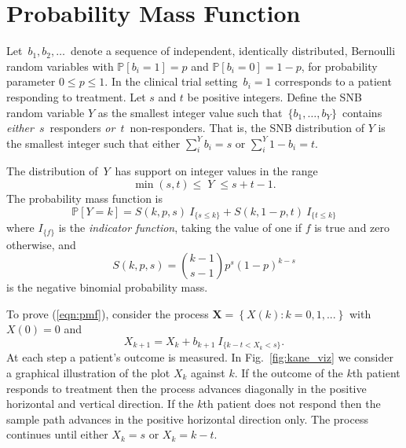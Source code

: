 \documentclass[review]{elsarticle}
\begin{document}
\section{Probability Mass Function}
\label{notation.section}

Let $\,b_1, b_2, \ldots \,$ denote a sequence of independent, identically
distributed, Bernoulli random variables with $\mathbb{P}[b_i=1]=p$ and
$\mathbb{P}[b_i = 0] = 1-p$, for
probability parameter $0\leq p \leq 1$. In the clinical trial setting
$\,b_i = 1$ corresponds to a patient responding to treatment.  
Let $s$ and $t$ be positive integers.  Define the SNB random
variable $Y$ as the smallest
integer value such that $\,\{b_1, \ldots , b_Y\}\,$ contains {\em either}
$\,s\,$ responders {\em or} $\,t\,$ non-responders. That is, the SNB 
distribution of $Y$ is the smallest integer such that either
$\sum_i^Y b_i = s$ or $\sum_i^Y 1-b_i = t$.

The distribution of $\,Y\,$ has support on integer values in the range
\begin{equation*}               
     \min(s,t) \leq \; Y \;\leq s+t-1  \label{range.y.eq}.
\end{equation*}
The probability mass function is
\begin{equation} \label{eqn:pmf}
\mathbb{P} [Y=k] = S(k, p, s) \ I_{\{s \leq k\}} + 
  S(k, 1-p, t) \ I_{\{ t \leq k \}}
\end{equation}
where $I_{\{f\}}$ is the {\em indicator function}, taking the value 
of one if $f$ is true and zero otherwise, and
\begin{equation} \label{eqn:N}
S(k, p, s) = {k-1 \choose s-1} p^s (1-p)^{k-s} 
\end{equation}
is the negative binomial probability mass.

To prove (\ref{eqn:pmf}), consider the
process $\mathbf{X} = \left\{X(k) : k = 0,1,... \right\}$
with $X(0)=0$ and
\begin{equation*} \label{eqn:proc}
X_{k+1} = X_k + b_{k+1} \ I_{\{ k-t < X_k < s\}}.
\end{equation*}
At each step a patient's outcome is measured. In Fig.~\ref{fig:kane_viz} 
we consider a graphical illustration of the plot $X_k$ against
$k$. If the outcome of the $k$th patient responds to treatment then the process 
advances diagonally in the positive horizontal and vertical direction. 
If the $k$th patient does not respond
then the sample path advances in the positive horizontal direction only. The
process continues until either $X_k = s$ or $X_k = k-t$.
\end{document}
